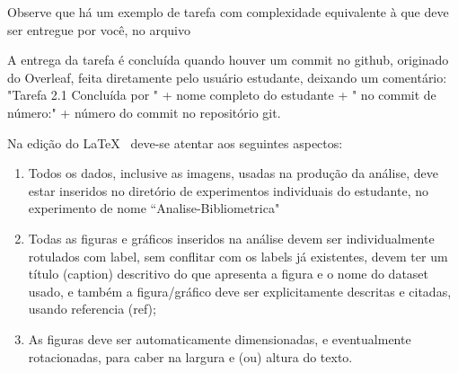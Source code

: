 Observe que há um exemplo de tarefa com complexidade equivalente à que deve ser entregue por você, no arquivo  

A entrega da tarefa é concluída quando houver um commit no github, originado do Overleaf, feita diretamente pelo usuário estudante, deixando um comentário: 
"Tarefa 2.1 Concluída por " + nome completo do estudante + " no commit de número:" + número do commit no repositório git.

Na edição do \LaTeX~ deve-se atentar aos seguintes aspectos:
\begin{enumerate}
    \item Todos os dados, inclusive as imagens, usadas na produção da análise, deve estar inseridos no diretório de experimentos individuais do estudante, no experimento de nome ``Analise-Bibliometrica"
    \item Todas as figuras e gráficos inseridos na análise devem ser individualmente rotulados com label, sem conflitar com os labels já existentes, devem ter um título (caption) descritivo do que apresenta a figura e o nome do dataset usado, e também a figura/gráfico deve ser explicitamente descritas e citadas, usando referencia (ref);
    \item As figuras deve ser automaticamente dimensionadas, e eventualmente rotacionadas,  para caber na largura e (ou) altura do texto. 
\end{enumerate}